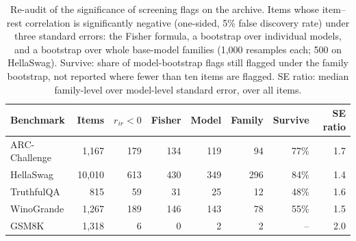 \begin{table}[!htb]\centering\small
\caption{Re-audit of the significance of screening flags on the archive. Items whose item--rest correlation is significantly negative (one-sided, 5\% false discovery rate) under three standard errors: the Fisher formula, a bootstrap over individual models, and a bootstrap over whole base-model families (1,000 resamples each; 500 on HellaSwag). Survive: share of model-bootstrap flags still flagged under the family bootstrap, not reported where fewer than ten items are flagged. SE ratio: median family-level over model-level standard error, over all items.}\label{tab:screen}
\begin{tabular}{lrrrrrrr}
\toprule
Benchmark & Items & $r_{ir}<0$ & Fisher & Model & Family & Survive & SE ratio\\
\midrule
ARC-Challenge & 1,167 & 179 & 134 & 119 & 94 & 77\% & 1.7\\
HellaSwag & 10,010 & 613 & 430 & 349 & 296 & 84\% & 1.4\\
TruthfulQA & 815 & 59 & 31 & 25 & 12 & 48\% & 1.6\\
WinoGrande & 1,267 & 189 & 146 & 143 & 78 & 55\% & 1.5\\
GSM8K & 1,318 & 6 & 0 & 2 & 2 & -- & 2.0\\
\bottomrule
\end{tabular}
\end{table}
